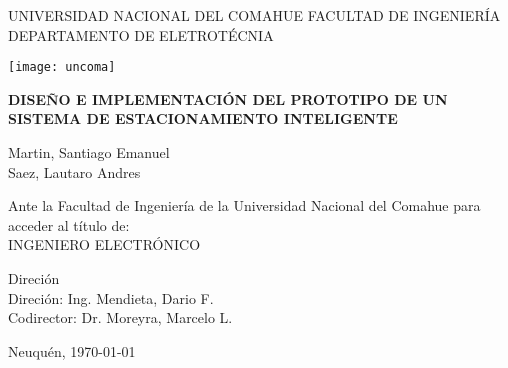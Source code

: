 \begin{titlepage}
    \begin{center}
        UNIVERSIDAD NACIONAL DEL COMAHUE
        FACULTAD DE INGENIERÍA
        DEPARTAMENTO DE ELETROTÉCNIA

        \vspace*{1cm}
        \texttt{[image: uncoma]}
        \vspace*{1cm}

        \begin{large}
            \uppercase{\textbf{Diseño e implementación del prototipo de un sistema de estacionamiento inteligente}}
        \end{large}

        \vspace*{1.5cm}

        Martin, Santiago Emanuel \\
        Saez, Lautaro Andres

        \vspace*{1cm}

        Ante la Facultad de Ingeniería de la Universidad Nacional del Comahue para
        acceder al título de:\\
        INGENIERO ELECTRÓNICO

        \vspace*{0.8cm}

        Direción\\
        Direción: Ing. Mendieta, Dario F. \\
        Codirector: Dr. Moreyra, Marcelo L.

        \vspace*{1cm}
        Neuquén, \today


    \end{center}
\end{titlepage}